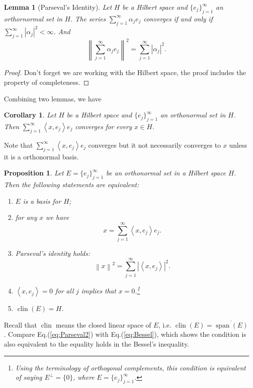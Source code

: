 \documentclass[12pt,a4paper]{report}
\numberwithin{equation}{section}
\theoremstyle{mystyle}
\newtheorem{lemma}[definition]{Lemma}
\newtheorem{corollary}[definition]{Corollary}
\newtheorem{proposition}[definition]{Proposition}
\newcommand{\abs}[1]{\left\lvert #1 \right\rvert}
\newcommand{\norm}[1]{\left\lVert #1 \right\rVert}
\newcommand{\inner}[1]{\left\langle #1 \right\rangle}
\newcommand{\clin}{\operatorname{clin}}
\newcommand{\spn}{\operatorname{span}}
\begin{document}
	\begin{lemma}[Parseval's Identity]
		Let $H$ be a Hilbert space and $\{e_j\}_{j=1}^\infty$ an orthornormal set in $H$. The series $\sum_{j=1}^\infty \alpha_j e_j$ converges if and only if $\sum_{j=1}^\infty \abs{\alpha_j}^2<\infty$. And 
		\begin{equation}
			\norm{\sum_{j=1}^\infty \alpha_j e_j}^2=\sum_{j=1}^\infty \abs{\alpha_j}^2.
		\end{equation}
	\end{lemma}
	\begin{proof}
		Don't forget we are working with the Hilbert space, the proof includes the property of completeness.
	\end{proof}

	Combining two lemmas, we have
	\begin{corollary}
		Let $H$ be a Hilbert space and $\{e_j\}_{j=1}^\infty$ an orthonormal set in $H$. Then $\sum_{j=1}^\infty \inner{x,e_j}e_j$ converges for every $x\in H$.
	\end{corollary}
	Note that $\sum_{j=1}^\infty \inner{x,e_j}e_j$ converges but it not necessarily converges to $x$ unless it is a orthonormal basis.
	\begin{proposition}
		Let $E=\{e_j\}_{j=1}^\infty$ be an orthonormal set in a Hilbert space $H$. Then the following statements are equivalent:
		\begin{enumerate}
			\item $E$ is a basis for $H$;
			\item for any $x$ we have
			\begin{equation}
				x=\sum_{j=1}^\infty \inner{x,e_j}e_j.
			\end{equation}
			\item Parseval's identity holds:
			\begin{equation}
				\norm{x}^2=\sum_{j=1}^\infty \abs{\inner{x,e_j}}^2.\label{eq:Parseval2}
			\end{equation}
			\item $\inner{x,e_j}=0$ for all $j$ implies that $x=0$.\footnote{
			Using the terminology of orthogonal complements, this condition is equivalent of saying $E^\perp=\{0\}$, where $E=\{e_j\}_{j=1}^\infty$.
			}
			\item $\clin(E)=H$.
		\end{enumerate}
	\label{prop:basis}
	\end{proposition}
	Recall that $\clin$ means the closed linear space of $E$, i.e. $\clin(E)=\overline{\spn(E)}$. Compare Eq.(\ref{eq:Parseval2}) with Eq.(\ref{eq:Bessel}), which shows the condition is also equivalent to the equality holds in the Bessel's inequality.
	
\end{document}

